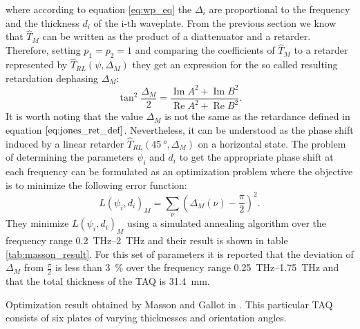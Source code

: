 where according to equation \ref{eq:wp_eq} the $\Delta_i$ are proportional to the frequency and the thickness $d_i$ of the i-th waveplate. From the previous section we know that $\hat{T}_M$ can be written as the product of a diattenuator and a retarder. Therefore, setting $p_1=p_2=1$ and comparing the coefficients of $\hat{T}_{M}$ to a retarder represented by $\hat{T}_{RL}(\psi, \Delta_M)$ they get an expression for the so called resulting retardation dephasing $\Delta_M$:
\begin{equation}
    \label{eq:retardation_dephasing}
    \tan^2 \frac{\Delta_M}{2} = \frac{\operatorname{Im}A^2+\operatorname{Im}B^2}
    {\operatorname{Re}A^2+\operatorname{Re}B^2}.
\end{equation}
It is worth noting that the value $\Delta_M$ is not the same as the retardance defined in equation $\ref{eq:jones_ret_def}$. Nevertheless, it can be understood as the phase shift induced by a linear retarder $\hat{T}_{RL}(\SI{45}{\degree}, \Delta_M)$ on a horizontal state. The problem of determining the parameters $\psi_i$ and $d_i$ to get the appropriate phase shift at each frequency can be formulated as an optimization problem where the objective is to minimize the following error function:
\begin{equation}
    \label{eq:mass_loss}
    L(\psi_i, d_i)_M=\sum_{\nu}\left(\Delta_M(\nu)-\frac{\pi}{2}\right)^2.
\end{equation}
They minimize $L(\psi_i, d_i)_M$ using a simulated annealing algorithm over the frequency range \SIrange{0.2}{2}{\tera \hertz} and their result is shown in table \ref{tab:masson_result}. For this set of parameters it is reported that the deviation of $\Delta_M$ from $\frac{\pi}{2}$ is less than \SI{3}{\percent} over the frequency range \SIrange{0.25}{1.75}{\tera \hertz} and that the total thickness of the TAQ is \SI{31.4}{\milli \meter}. 

\begin{table}[h]
    \centering
    
    \caption{Optimization result obtained by Masson and Gallot in \cite{Masson2006}. This particular TAQ consists of six plates of varying thicknesses and orientation angles.}
    \label{tab:masson_result}
\end{table}

